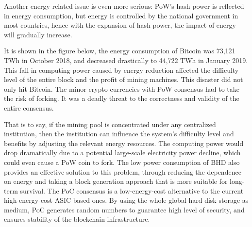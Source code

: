 \begin{flushleft}
    Another energy related issue is even more serious: PoW's hash power is reflected in energy consumption, but energy is controlled by the national government in most countries, hence with the expansion of hash power, the impact of energy will gradually increase.
\end{flushleft}
\begin{flushleft}
    It is shown in the figure below, the energy consumption of Bitcoin was 73,121 TWh in October 2018, and decreased drastically to 44,722 TWh in January 2019. This fall in computing power caused by energy reduction affected the difficulty level of the entire block and the profit of mining machines. This disaster did not only hit Bitcoin. The minor crypto currencies with PoW consensus had to take the risk of forking. It was a deadly threat to the correctness and validity of the entire consensus.
\end{flushleft}
\begin{flushleft}
    That is to say, if the mining pool is concentrated under any centralized institution, then the institution can influence the system's difficulty level and benefits by adjusting the relevant energy resources. The computing power would drop dramatically due to a potential large-scale electricity power decline, which could even cause a PoW coin to fork. The low power consumption of BHD also provides an effective solution to this problem, through reducing the dependence on energy and taking a block generation approach that is more suitable for long-term survival. The PoC consensus is a low-energy-cost alternative to the current high-energy-cost ASIC based ones. By using the whole global hard disk storage as medium, PoC generates random numbers to guarantee high level of security, and ensures stability of the blockchain infrastructure.
\end{flushleft}
